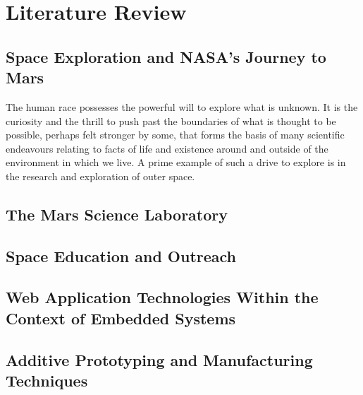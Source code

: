 \chapter{Literature Review}
  \section{Space Exploration and NASA's Journey to Mars}
    The human race possesses the powerful will to explore what is unknown. It is the curiosity and the thrill to push past the boundaries of what is thought to be possible, perhaps felt stronger by some, that forms the basis of many scientific endeavours relating to facts of life and existence around and outside of the environment in which we live. A prime example of such a drive to explore is in the research and exploration of outer space.
    
  \section{The Mars Science Laboratory}

  \section{Space Education and Outreach}
  
  \section{Web Application Technologies Within the Context of Embedded Systems}
  
  \section{Additive Prototyping and Manufacturing Techniques}